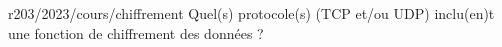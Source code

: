 \begin{question}{r203/2023/cours/chiffrement}
  Quel(s) protocole(s) (TCP et/ou UDP) inclu(en)t une fonction de
  chiffrement des données ?
  \begin{reponses}
  \end{reponses}
\end{question}
